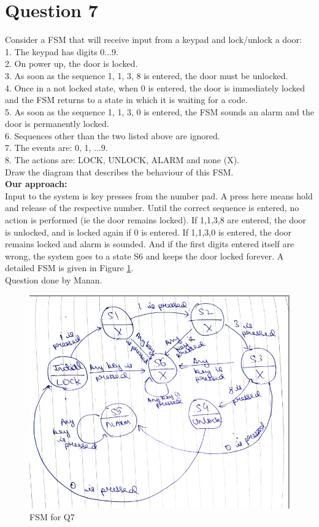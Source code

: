 \documentclass[11pt,a4paper]{article}
\begin{document}
	\section*{Question 7}
	Consider a FSM that will receive input from a keypad and lock/unlock a door:\\
	1. The keypad has digits 0...9. \\
	2. On power up, the door is locked. \\
	3. As soon as the sequence 1, 1, 3, 8 is entered, the door must be unlocked.\\
	4. Once in a not locked state, when 0 is entered, the door is immediately locked and the FSM returns to a state in which it is waiting for a code.\\
	5. As soon as the sequence 1, 1, 3, 0 is entered, the FSM sounds an alarm and the door is permanently locked.\\
	6. Sequences other than the two listed above are ignored.\\
	7. The events are: 0, 1, ...9.\\
	8. The actions are: LOCK, UNLOCK, ALARM and none (X).\\
	Draw the diagram that describes the behaviour of this FSM.\\
	\textbf{Our approach: }\\
	Input to the system is key presses from the number pad. A press here means hold and release of the respective number. Until the correct sequence is entered, no action is performed (ie the door remains locked). If 1,1,3,8 are entered, the door is unlocked, and is locked again if 0 is entered. If 1,1,3,0 is entered, the door remains locked and alarm is sounded. And if the first digits entered itself are wrong, the system goes to a state S6 and keeps the door locked forever. A detailed FSM is given in Figure \ref{fig:q7fsm}.\\
	Question done by Manan.
	\begin{figure}[H]
		\centering
		\includegraphics[scale=0.7]{images/q7fsm}
		\caption[]{FSM for Q7}
		\label{fig:q7fsm}
	\end{figure}
\end{document}

